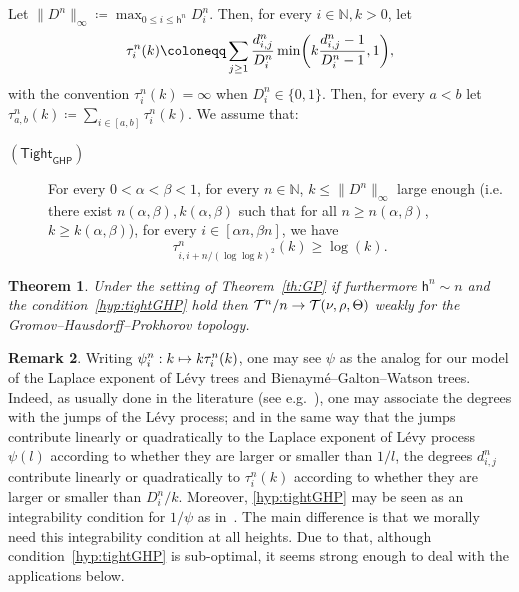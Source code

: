 \documentclass[10pt]{amsart}
\makeatletter
\newtheorem{theo}{Theorem}[section]
\theoremstyle{definition}\newtheorem{defi}[theo]{Definition}\newtheorem{rema}[theo]{Remark}\newtheorem{exam}[theo]{Example}\newtheorem{exem}[theo]{Example}\newtheorem{nota}[theo]{Notation}
\newcommand{\optionaldesc}[2]{
\phantomsection #1\protected@edef\@currentlabel{#1}\label{#2}
}
\newcommand{\N}{\mathbb{N}}
\newcommand{\1}{\mathbbm{1}}
\newcommand{\T}{\mathcal{T}}
\newcommand{\h}{\mathsf{h}}
\newcommand{\sTight}{\mathsf{Tight}}
\newcommand{\sGHP}{\mathsf{GHP}}
\let\originalleft\left
\let\originalright\right
\renewcommand{\left}{\mathopen{}\mathclose\bgroup\originalleft}
\renewcommand{\right}{\aftergroup\egroup\originalright}
\renewcommand*{\to}{\mathchoice{\longrightarrow}{\rightarrow}{\rightarrow}{\rightarrow}}
\let\oldmapsto\mapsto
\renewcommand*{\mapsto}{\mathchoice{\longmapsto}{\oldmapsto}{\oldmapsto}{\oldmapsto}}
\makeatother
\begin{document}
Let $\|D^n\|_\infty\coloneqq \max_{0\leq i\leq \h^n} D_i^n$.
Then, for every $i\in \N, k>0$, let
\begin{equation}\label{eq def tau}
\tau^n_{i}(k)\coloneqq\sum_{j\ge 1} \frac{d^n_{i,j}}{D^n_i} \min\left (k\frac{d^n_{i,j}-1}{D^n_i-1},1 \right),
\end{equation}
with the convention $\tau^n_i(k)=\infty$ when $D^n_i\in \{0,1\}$. Then, for every $a<b$ let $\tau^n_{a,b}(k)\coloneqq\sum_{i\in [a,b]}\tau^n_i(k)$. We assume that:
\smallskip
\begin{mdframed}[linecolor=black!60]
\begin{description}
\item[\textcolor{link}{\optionaldesc{$(\sTight_{\sGHP})$}{hyp:tightGHP}}] For every $0<\alpha<\beta<1$, for every $n\in \N$, $k\leq \|D^n\|_\infty$ large enough (i.e. there exist $n(\alpha, \beta), k(\alpha, \beta)$ such that for all $n\geq n(\alpha,\beta)$, $k\geq k(\alpha,\beta)$), for every $i\in [\alpha n,\beta n]$, we have
\[
\tau_{i,i+n/(\log \log k)^2}^n(k)\geq \log(k).
\]
\end{description}
\end{mdframed}

\begin{theo}\label{th:GHP}
Under the setting of Theorem~\ref{th:GP} if furthermore $\h^n\sim n$ and the condition~\ref{hyp:tightGHP} hold then
$\T^n/n\to \T(\nu,\rho,\Theta)$ weakly for the Gromov--Hausdorff--Prokhorov topology.
\end{theo}

\begin{rema}
Writing $\psi_i^n:k\mapsto k\tau_i^n(k)$, one may see $\psi$ as the analog for our model of the Laplace exponent of Lévy trees and Bienaymé--Galton--Watson trees. {Indeed, as usually done in the literature (see e.g.~\cite{DLG05}), one may associate the degrees with the jumps of the Lévy process; and in the same way that the jumps contribute linearly or quadratically to the Laplace exponent of Lévy process $\psi(l)$ according to whether they are larger or smaller than $1/l$, the degrees $d_{i,j}^n$ contribute linearly or quadratically to $\tau_i^n(k)$ according to whether they are larger or smaller than $D_i^n/k$.} Moreover, \ref{hyp:tightGHP} may be seen as an integrability condition for $1/\psi$ { as in~\cite[Eq.~(7)]{DLG05}}. The main difference is that we morally need this integrability condition at all heights. Due to that, although condition~\ref{hyp:tightGHP} is sub-optimal, it seems strong enough to deal with the applications below.
\end{rema}
\end{document}
